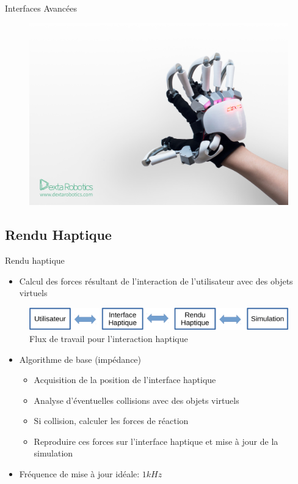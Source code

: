 \documentclass[compress, noflama]{beamer}
\begin{document}
{
\begin{frame}{Interfaces Avancées}
\begin{figure}
\href{run:videos/dexmo.mp4}{\includegraphics[width=\linewidth]{images/dexmo-prototype-81}}
\end{figure}
\end{frame}
}

\subsection{Rendu Haptique}
\begin{frame}{Rendu haptique}
\begin{itemize}
\item Calcul des forces résultant de l'interaction de l'utilisateur avec des objets virtuels
\end{itemize}
\begin{figure}
\centering
\includegraphics[width=\linewidth]{images/schema_haptique}	
\caption{Flux de travail pour l'interaction haptique}
\end{figure}
\begin{itemize}
\item Algorithme de base (impédance)
\begin{itemize}
\item Acquisition de la position de l'interface haptique
\item Analyse d'éventuelles collisions avec des objets virtuels
\item Si collision, calculer les forces de réaction
\item Reproduire ces forces sur l'interface haptique et mise à jour de la simulation
\end{itemize}
\end{itemize}
\begin{itemize}
\item Fréquence de mise à jour idéale: $1kHz$
\end{itemize}
\end{frame}
\end{document}
